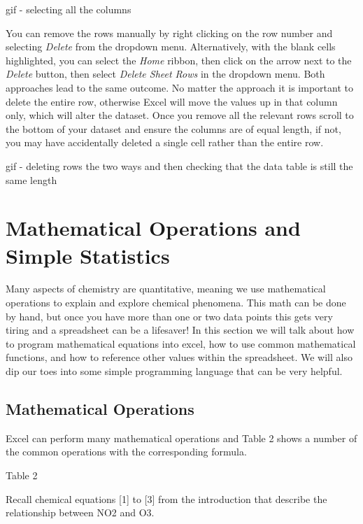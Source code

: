 \documentclass[
]{book}
\begin{document}
gif - selecting all the columns

You can remove the rows manually by right clicking on the row number and selecting \emph{Delete} from the dropdown menu. Alternatively, with the blank cells highlighted, you can select the \emph{Home} ribbon, then click on the arrow next to the \emph{Delete} button, then select \emph{Delete Sheet Rows} in the dropdown menu. Both approaches lead to the same outcome. No matter the approach it is important to delete the entire row, otherwise Excel will move the values up in that column only, which will alter the dataset. Once you remove all the relevant rows scroll to the bottom of your dataset and ensure the columns are of equal length, if not, you may have accidentally deleted a single cell rather than the entire row.

gif - deleting rows the two ways and then checking that the data table is still the same length

\hypertarget{mathematical-operations-and-simple-statistics}{%
\chapter{Mathematical Operations and Simple Statistics}\label{mathematical-operations-and-simple-statistics}}

Many aspects of chemistry are quantitative, meaning we use mathematical operations to explain and explore chemical phenomena. This math can be done by hand, but once you have more than one or two data points this gets very tiring and a spreadsheet can be a lifesaver! In this section we will talk about how to program mathematical equations into excel, how to use common mathematical functions, and how to reference other values within the spreadsheet. We will also dip our toes into some simple programming language that can be very helpful.

\hypertarget{mathematical-operations}{%
\section{Mathematical Operations}\label{mathematical-operations}}

Excel can perform many mathematical operations and Table 2 shows a number of the common operations with the corresponding formula.

Table 2

Recall chemical equations {[}1{]} to {[}3{]} from the introduction that describe the relationship between NO2 and O3.
\end{document}
